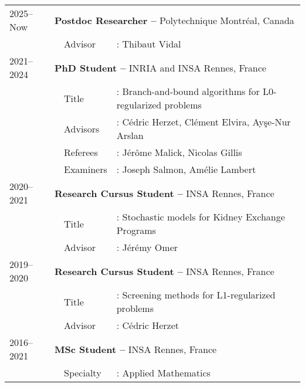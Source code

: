 \begin{longtable}[l]{@{}p{}p{}p{}p{}}
    2025--Now & \multicolumn{3}{l}{\textbf{Postdoc Researcher --} Polytechnique Montréal, Canada} \\
    & & Advisor &: Thibaut Vidal \\
    2021--2024 & \multicolumn{3}{l}{\textbf{PhD Student --} INRIA and INSA Rennes, France} \\
    & & Title &: Branch-and-bound algorithms for L0-regularized problems \\
    & & Advisors &: Cédric Herzet, Clément Elvira, Ay\c{s}e-Nur Arslan \\
    & & Referees &:  Jérôme Malick, Nicolas Gillis \\
    & & Examiners &: Joseph Salmon, Amélie Lambert \\
    2020--2021 & \multicolumn{3}{l}{\textbf{Research Cursus Student --} INSA Rennes, France} \\
    & & Title &: Stochastic models for Kidney Exchange Programs \\
    & & Advisor &: Jérémy Omer \\
    2019--2020 & \multicolumn{3}{l}{\textbf{Research 
    Cursus Student --} INSA Rennes, France} \\
    & & Title &: Screening methods for L1-regularized problems \\
    & & Advisor &: Cédric Herzet \\
    2016--2021 & \multicolumn{3}{l}{\textbf{MSc Student --} INSA Rennes, France} \\
    & & Specialty &: Applied Mathematics 
\end{longtable}
